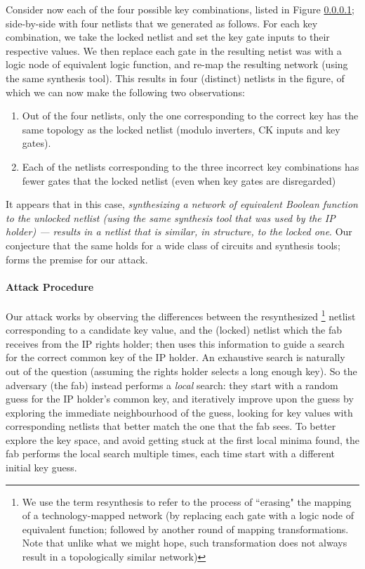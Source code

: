 Consider now each of the four possible key combinations, listed in Figure \ref{}; side-by-side with four netlists that we generated as follows. For each key combination, we take the locked netlist and set the key gate inputs to their respective values. We then replace each gate in the resulting netist was with a logic node of equivalent logic function, and re-map the resulting network (using the same synthesis tool). This results in four (distinct) netlists in the figure, of which we can now make the following two observations:

\begin{enumerate}
    \item Out of the four netlists, only the one corresponding to the correct key has the same topology as the locked netlist (modulo inverters, CK inputs and key gates).
    \item Each of the netlists corresponding to the three incorrect key combinations has fewer gates that the locked netlist (even when key gates are disregarded)
\end{enumerate}

It appears that in this case, \emph{synthesizing a network of equivalent Boolean function to the unlocked netlist (using the same synthesis tool that was used by the IP holder) --- results in a netlist that is similar, \emph{in structure}, to the locked one}. Our conjecture that the same holds for a wide class of circuits and synthesis tools; forms the premise for our attack.

\paragraph{Attack Procedure} Our attack works by observing the differences between the resynthesized \footnote{We use the term resynthesis to refer to the process of ``erasing" the mapping of a technology-mapped network (by replacing each gate with a logic node of equivalent function; followed by another round of mapping transformations. Note that unlike what we might hope, such transformation does not always result in a topologically similar network) } netlist corresponding to a candidate key value, and the (locked) netlist which the fab receives from the IP rights holder; then uses this information to guide a search for the correct common key of the IP holder. An exhaustive search is naturally out of the question (assuming the rights holder selects a long enough key). So the adversary (the fab) instead performs a \emph{local} search: they start with a random guess for the IP holder's common key, and iteratively improve upon the guess by exploring the immediate neighbourhood of the guess, looking for key values with corresponding netlists that better match the one that the fab sees. To better explore the key space, and avoid getting stuck at the first local minima found, the fab performs the local search multiple times, each time start with a different initial key guess. 

